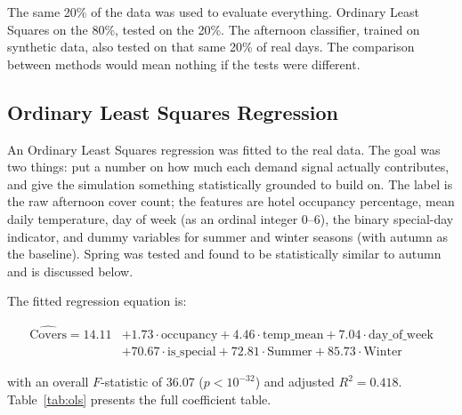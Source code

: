 \documentclass[12pt,a4paper,oneside]{article}
\begin{document}
The same 20\% of the data was used to evaluate everything. Ordinary Least Squares on the 80\%, tested on the 20\%. The afternoon classifier, trained on synthetic data, also tested on that same 20\% of real days. The comparison between methods would mean nothing if the tests were different.

\subsection{Ordinary Least Squares Regression}
\label{sec:ols}

An Ordinary Least Squares regression was fitted to the real data. The goal was two things: put a number on how much each demand signal actually contributes, and give the simulation something statistically grounded to build on. The label is the raw afternoon cover count; the features are hotel occupancy percentage, mean daily temperature, day of week (as an ordinal integer 0--6), the binary special-day indicator, and dummy variables for summer and winter seasons (with autumn as the baseline). Spring was tested and found to be statistically similar to autumn and is discussed below.

The fitted regression equation is:

\begin{equation}
\begin{split}
\widehat{\text{Covers}} = 14.11 &+ 1.73 \cdot \text{occupancy} + 4.46 \cdot \text{temp\_mean} + 7.04 \cdot \text{day\_of\_week} \\
                                &+ 70.67 \cdot \text{is\_special} + 72.81 \cdot \text{Summer} + 85.73 \cdot \text{Winter}
\end{split}
\label{eq:ols}
\end{equation}

\noindent with an overall $F$-statistic of 36.07 ($p < 10^{-32}$) and adjusted $R^2 = 0.418$. Table~\ref{tab:ols} presents the full coefficient table.
\end{document}
